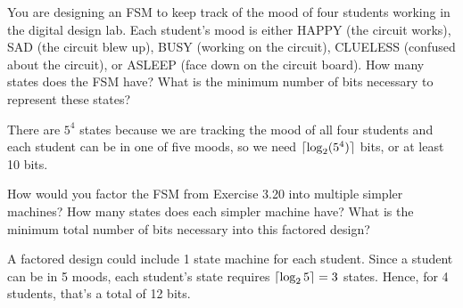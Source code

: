 \documentclass[12pt]{article}
\DeclarePairedDelimiter{\ceil}{\lceil}{\rceil}
\newenvironment{ex}[2][Exercise]{\begin{trivlist}
		\item[\hskip \labelsep {\bfseries #1}\hskip \labelsep {\bfseries #2.}]}{\end{trivlist}}
\newenvironment{sol}[1][Solution]{\begin{trivlist}
		\item[\hskip \labelsep {\bfseries #1:}]}{\end{trivlist}}
\begin{document}
\begin{ex}{3.20}
	You are designing an FSM to keep track of the mood of four students working in the digital design lab.
	Each student's mood is either HAPPY (the circuit works), SAD (the circuit blew up), BUSY (working on the
	circuit), CLUELESS (confused about the circuit), or ASLEEP (face down on the circuit board). How many
	states does the FSM have? What is the minimum number of bits necessary to represent these states?
\end{ex}

\begin{sol}
	There are $5^4$ states because we are tracking the mood of all four students and each student can be in
	one of five moods, so we need $\ceil{\log_2(5^4)}$ bits, or at least 10 bits.
\end{sol}

\begin{ex}{3.21}
	How would you factor the FSM from Exercise 3.20 into multiple simpler machines? How many states does
	each simpler machine have? What is the minimum total number of bits necessary into this factored
	design?
\end{ex}

\begin{sol}
	A factored design could include 1 state machine for each student. Since a student can be in 5 moods, each
	student's state requires $\ceil{\log_2{5}}=3$ states. Hence, for 4 students, that's a total of 12 bits.
\end{sol}
\end{document}
